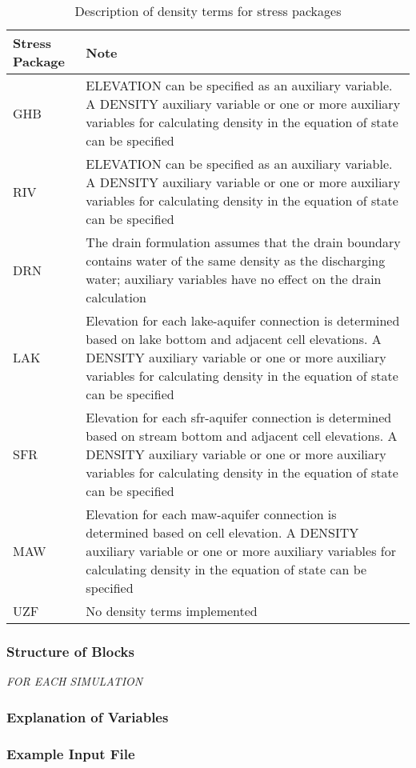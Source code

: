 \begin{longtable}{p{3cm} p{12cm}}
\caption{Description of density terms for stress packages}
\tabularnewline
\hline
\hline
\textbf{Stress Package} & \textbf{Note} \\
\hline
\endhead
\hline
\endfoot
GHB & ELEVATION can be specified as an auxiliary variable.  A DENSITY auxiliary variable or one or more auxiliary variables for calculating density in the equation of state can be specified \\
RIV & ELEVATION can be specified as an auxiliary variable.  A DENSITY auxiliary variable or one or more auxiliary variables for calculating density in the equation of state can be specified \\
DRN & The drain formulation assumes that the drain boundary contains water of the same density as the discharging water; auxiliary variables have no effect on the drain calculation  \\
LAK & Elevation for each lake-aquifer connection is determined based on lake bottom and adjacent cell elevations. A DENSITY auxiliary variable or one or more auxiliary variables for calculating density in the equation of state can be specified \\
SFR & Elevation for each sfr-aquifer connection is determined based on stream bottom and adjacent cell elevations. A DENSITY auxiliary variable or one or more auxiliary variables for calculating density in the equation of state can be specified \\
MAW & Elevation for each maw-aquifer connection is determined based on cell elevation. A DENSITY auxiliary variable or one or more auxiliary variables for calculating density in the equation of state can be specified \\
UZF & No density terms implemented \\
\end{longtable}

\vspace{5mm}
\subsubsection{Structure of Blocks}

\vspace{5mm}
\noindent \textit{FOR EACH SIMULATION}



%

\vspace{5mm}
\subsubsection{Explanation of Variables}
\begin{description}

\end{description}

\vspace{5mm}
\subsubsection{Example Input File}


